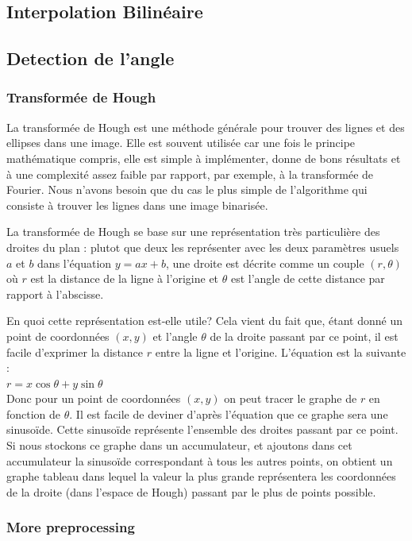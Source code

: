 \subsection{Interpolation Bilinéaire}
\subsection{Detection de l'angle}
\subsubsection{Transformée de Hough}

La transformée de Hough est une méthode générale pour trouver des lignes et des ellipses dans une image. Elle est souvent utilisée car une fois le principe mathématique compris, elle est simple à implémenter, donne de bons résultats et à une complexité assez faible par rapport, par exemple, à la transformée de Fourier. Nous n'avons besoin que du cas le plus simple de l'algorithme qui consiste à trouver les lignes dans une image binarisée.

La transformée de Hough se base sur une représentation très particulière des droites du plan : plutot que deux les représenter avec les deux paramètres usuels $a$ et $b$ dans l'équation $y = ax + b$, une droite est décrite comme un couple $(r, \theta)$ où $r$ est la distance de la ligne à l'origine et $\theta$ est l'angle de cette distance par rapport à l'abscisse.

En quoi cette représentation est-elle utile? Cela vient du fait que, étant donné un point de coordonnées $(x, y)$ et l'angle $\theta$ de la droite passant par ce point, il est facile d'exprimer la distance $r$ entre la ligne et l'origine. L'équation est la suivante :\\
$r = x\cos\theta + y\sin\theta$\\
Donc pour un point de coordonnées $(x, y)$ on peut tracer le graphe de $r$ en fonction de $\theta$. Il est facile de deviner d'après l'équation que ce graphe sera une sinusoïde. Cette sinusoïde représente l'ensemble des droites passant par ce point. Si nous stockons ce graphe dans un accumulateur, et ajoutons dans cet accumulateur la sinusoïde correspondant à tous les autres points, on obtient un graphe tableau dans lequel la valeur la plus grande représentera les coordonnées de la droite (dans l'espace de Hough) passant par le plus de points possible.

\subsubsection{More preprocessing}

